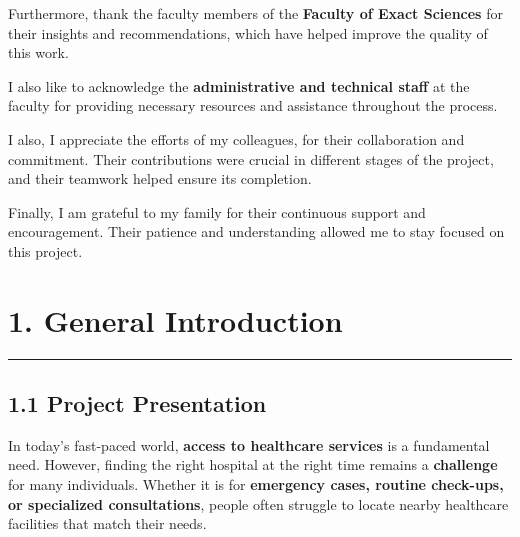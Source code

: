 \documentclass[12pt]{report}
\begin{document}
\noindent Furthermore, thank the faculty members of the \textbf{Faculty of Exact Sciences} for their insights and recommendations, which have helped improve the quality of this work.  \vspace*{0.5cm}

\noindent I also like to acknowledge the \textbf{administrative and technical staff} at the faculty for providing necessary resources and assistance throughout the process.  \vspace*{0.5cm}

\noindent I also, I appreciate the efforts of my colleagues, for their collaboration and commitment. Their contributions were crucial in different stages of the project, and their teamwork helped ensure its completion.  \vspace*{0.5cm}

\noindent Finally, I am grateful to my family for their continuous support and encouragement. Their patience and understanding allowed me to stay focused on this project.

\newpage












\section*{\textbf{1. General Introduction}}
\rule{\linewidth}{1pt}  %



\subsection*{\textbf{1.1 Project Presentation}}

In today's fast-paced world, \textbf{access to healthcare services} is a fundamental need. However, finding the right hospital at the right time remains a \textbf{challenge} for many individuals. Whether it is for \textbf{emergency cases, routine check-ups, or specialized consultations}, people often struggle to locate nearby healthcare facilities that match their needs.
\end{document}
